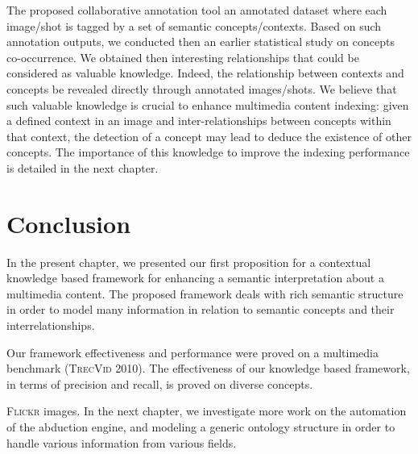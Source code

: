 	The proposed collaborative annotation tool  an annotated dataset where each 
	image/shot is tagged by a set of semantic concepts/contexts. Based on such annotation outputs, 
	we conducted then an earlier statistical study on concepts co-occurrence. 
	We obtained then interesting relationships that could be considered as valuable knowledge. 
	Indeed, the relationship between contexts and concepts  be revealed directly 
	through annotated images/shots. We believe that such valuable knowledge is crucial to 
	enhance multimedia content indexing: given a defined context in an image and 
	inter-relationships between concepts within that context, the detection of a concept may 
	lead to deduce the existence of other concepts. The importance of this knowledge to improve 
	the indexing performance is detailed in the next chapter. 
	

\section{Conclusion}
\label{c1_4}
	In the present chapter, we presented our  first proposition for a contextual 
	knowledge based framework for enhancing a semantic interpretation about a multimedia
	content. The proposed framework deals with rich semantic structure in order to model
	many information in relation to semantic concepts and their interrelationships. 
	
	Our framework effectiveness and performance were proved on a multimedia benchmark 
	(\textsc{TrecVid 2010}). The effectiveness of our knowledge based framework, 
	in terms of precision and recall, is proved on diverse concepts.
	
	\textsc{Flickr} images. 
	In the next chapter, we investigate more work  
	on the automation of the abduction engine, and modeling a generic ontology
	structure in order to handle various information from various fields.

		



